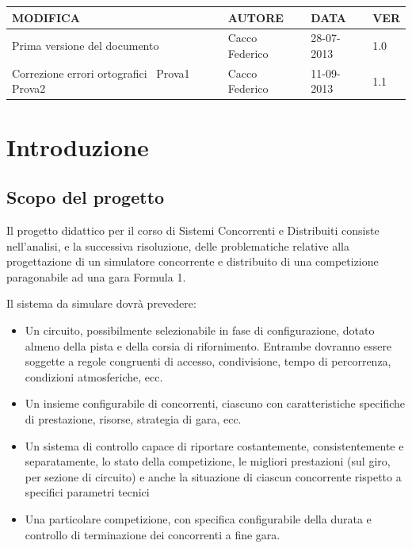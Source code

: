 \documentclass[a4paper,11pt, twoside]{book}
\begin{document}
  \begin{small}
    
    \begin{longtable}{|p{6cm}|p{2.4cm}|p{1.8cm}|p{0.8cm}|}
      \toprule
	\bfseries{MODIFICA} & \bfseries{AUTORE} & \bfseries{DATA} & \bfseries{VER} \\
      \hline \hline \endfirsthead
      
      Prima versione del documento & Cacco Federico & 28-07-2013 & 1.0 \\\hline
      
      Correzione errori ortografici \newline\
      Prova1 \newline
      Prova2
      & Cacco Federico & 11-09-2013 & 1.1 \\\hline
    \end{longtable}
    
  \end{small}
    
  \tableofcontents
  \newpage
  
  \chapter{Introduzione}
    \setcounter{page}{1}
    
    \section{Scopo del progetto}
      Il progetto didattico per il corso di Sistemi Concorrenti e Distribuiti consiste nell'analisi, e la
      successiva risoluzione,
      delle problematiche relative alla progettazione di un simulatore concorrente e distribuito 
      di una competizione paragonabile ad una gara Formula 1.
      
      Il sistema da simulare dovrà prevedere:
      \begin{itemize}
	\item Un circuito, possibilmente selezionabile in fase di configurazione, dotato almeno della pista e della corsia di 
	  rifornimento.
	  Entrambe dovranno essere soggette a regole congruenti di accesso, condivisione, 
	  tempo di percorrenza, condizioni atmosferiche, ecc.
	\item Un insieme configurabile di concorrenti, ciascuno con caratteristiche specifiche di prestazione, risorse, 
	  strategia di gara, ecc.
	\item Un sistema di controllo capace di riportare costantemente, consistentemente e separatamente, 
	  lo stato della competizione, le migliori prestazioni (sul giro, per sezione di circuito) e anche la 
	  situazione di ciascun concorrente rispetto a specifici parametri tecnici
	\item Una particolare competizione, con specifica configurabile della durata e controllo di terminazione 
	  dei concorrenti a fine gara.
      \end{itemize}
      
\end{document}
